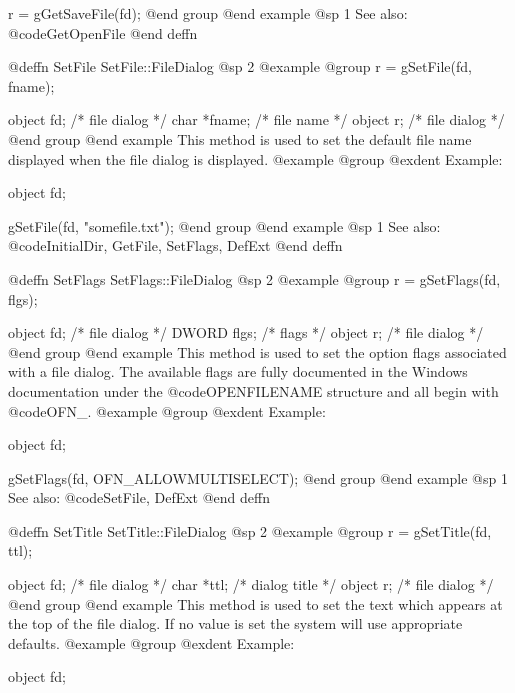 r = gGetSaveFile(fd);
@end group
@end example
@sp 1
See also:  @code{GetOpenFile}
@end deffn








@deffn {SetFile} SetFile::FileDialog
@sp 2
@example
@group
r = gSetFile(fd, fname);

object  fd;     /*  file dialog  */
char    *fname; /*  file name    */
object  r;      /*  file dialog  */
@end group
@end example
This method is used to set the default file name displayed when the
file dialog is displayed.
@example
@group
@exdent Example:

object  fd;

gSetFile(fd, "somefile.txt");
@end group
@end example
@sp 1
See also:  @code{InitialDir, GetFile, SetFlags, DefExt}
@end deffn







@deffn {SetFlags} SetFlags::FileDialog
@sp 2
@example
@group
r = gSetFlags(fd, flgs);

object  fd;     /*  file dialog  */
DWORD   flgs;   /*  flags        */
object  r;      /*  file dialog  */
@end group
@end example
This method is used to set the option flags associated with a file dialog.
The available flags are fully documented in the Windows documentation
under the @code{OPENFILENAME} structure and all begin with @code{OFN_}.
@example
@group
@exdent Example:

object  fd;

gSetFlags(fd, OFN_ALLOWMULTISELECT);
@end group
@end example
@sp 1
See also:  @code{SetFile, DefExt}
@end deffn















@deffn {SetTitle} SetTitle::FileDialog
@sp 2
@example
@group
r = gSetTitle(fd, ttl);

object  fd;     /*  file dialog  */
char    *ttl;   /*  dialog title */
object  r;      /*  file dialog  */
@end group
@end example
This method is used to set the text which appears at the top of the
file dialog.  If no value is set the system will use appropriate defaults.
@example
@group
@exdent Example:

object  fd;

